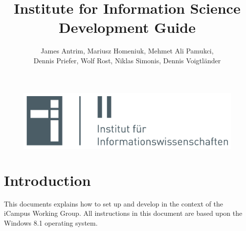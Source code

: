 \documentclass[]{report}
\begin{document}
\title{Institute for Information Science Development Guide}
\author{James Antrim, Mariusz Homeniuk, Mehmet Ali Pamukci,\\Dennis Priefer, Wolf Rost, Niklas Simonis, Dennis Voigtl\"ander}

\begin{figure}
\includegraphics[width=14cm]{ii-01.png}
\maketitle
\end{figure}

\newpage
\tableofcontents

\chapter{Introduction}

This documents explains how to set up and develop in the context of the iCampus Working Group. All instructions in this document are based upon the Windows 8.1 operating system.










\end{document}
